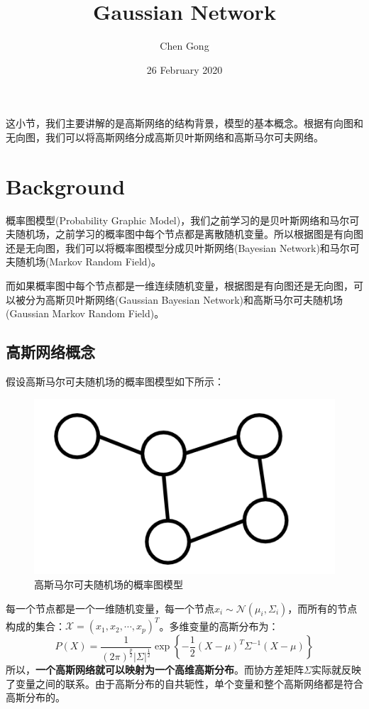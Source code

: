 \documentclass[a4paper]{article}
\title{Gaussian Network}
\author{Chen Gong}
\date{26 February 2020}
\begin{document}
\maketitle
\tableofcontents
\newpage
\setcounter{page}{1} %
\clearpage
这小节，我们主要讲解的是高斯网络的结构背景，模型的基本概念。根据有向图和无向图，我们可以将高斯网络分成高斯贝叶斯网络和高斯马尔可夫网络。
\section{Background}
概率图模型(Probability Graphic Model)，我们之前学习的是贝叶斯网络和马尔可夫随机场，之前学习的概率图中每个节点都是离散随机变量。所以根据图是有向图还是无向图，我们可以将概率图模型分成贝叶斯网络(Bayesian Network)和马尔可夫随机场(Markov Random Field)。

而如果概率图中每个节点都是一维连续随机变量，根据图是有向图还是无向图，可以被分为高斯贝叶斯网络(Gaussian Bayesian Network)和高斯马尔可夫随机场(Gaussian Markov Random Field)。
\subsection{高斯网络概念}
假设高斯马尔可夫随机场的概率图模型如下所示：
\begin{figure}[H]
    \centering
    \includegraphics[width=.4\textwidth]{微信图片_20200226164330.png}
    \caption{高斯马尔可夫随机场的概率图模型}
    \label{fig:my_label_1}
\end{figure}
每一个节点都是一个一维随机变量，每一个节点$x_i \sim \mathcal{N}(\mu_i,\Sigma_i)$，而所有的节点构成的集合：$\mathcal{X}=(x_1,x_2,\cdots,x_p)^T$。多维变量的高斯分布为：
\begin{equation}
    P(X) = \frac{1}{(2\pi)^{\frac{p}{2}}|\Sigma|^{\frac{1}{2}}} \exp \left\{ -\frac{1}{2} (X-\mu)^T\Sigma^{-1}(X-\mu) \right\}
\end{equation}
所以，\textbf{一个高斯网络就可以映射为一个高维高斯分布}。而协方差矩阵$\Sigma$实际就反映了变量之间的联系。由于高斯分布的自共轭性，单个变量和整个高斯网络都是符合高斯分布的。
\end{document}
